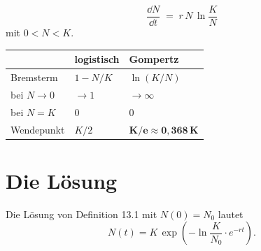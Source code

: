 \begin{definition}
\[ \frac{\dd N}{\dd t} \;=\; r\,N\,\ln\frac{K}{N} \]
mit $0 < N < K$.
\end{definition}

\begin{merksatz}
\begin{center}
{\small
\renewcommand{\arraystretch}{1.5}
\begin{tabular}{@{}P{2.0cm}P{2.6cm}P{3.4cm}@{}}
\toprule
& \textbf{logistisch} & \textbf{Gompertz}\\
\midrule
Bremsterm & $1 - N/K$ & $\ln(K/N)$\\
bei $N \to 0$ & $\to 1$ & \textcolor{akzent}{$\to \infty$}\\
bei $N = K$ & $0$ & $0$\\
Wendepunkt & $K/2$ & $\mathbf{K/e \approx 0{,}368\,K}$\\
\bottomrule
\end{tabular}}
\end{center}

\begin{center}
\begin{minipage}{0.88\textwidth}
\end{minipage}
\end{center}
\end{merksatz}

\section{Die Lösung}

\begin{merksatz}
Die Lösung von Definition 13.1 mit $N(0) = N_0$ lautet
\[ N(t) = K\,\exp\left(-\ln\frac{K}{N_0}\cdot e^{-rt}\right) . \]
\end{merksatz}

